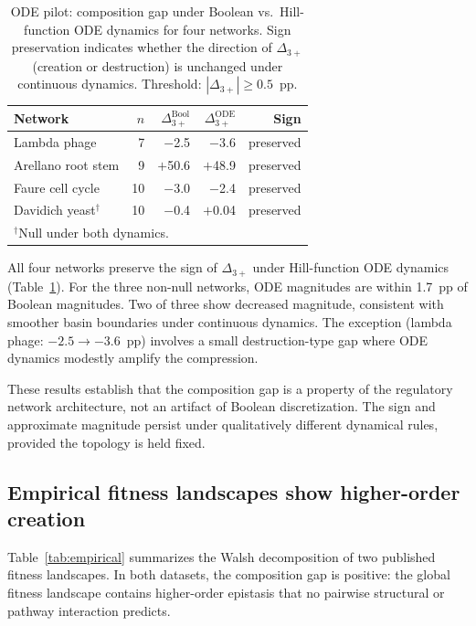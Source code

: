 \documentclass[10pt]{article}
\begin{document}
\begin{table}[t]
\centering
\caption{ODE pilot: composition gap under Boolean vs.\ Hill-function
ODE dynamics for four networks. Sign preservation indicates whether
the direction of $\Delta_{3+}$ (creation or destruction) is
unchanged under continuous dynamics. Threshold: $|\Delta_{3+}| \geq
0.5$~pp.}
\label{tab:ode-pilot}
\begin{tabular}{lrrrr}
\toprule
Network & $n$ & $\Delta_{3+}^{\mathrm{Bool}}$ & $\Delta_{3+}^{\mathrm{ODE}}$ & Sign \\
\midrule
Lambda phage & 7 & $-$2.5 & $-$3.6 & preserved \\
Arellano root stem & 9 & $+$50.6 & $+$48.9 & preserved \\
Faure cell cycle & 10 & $-$3.0 & $-$2.4 & preserved \\
Davidich yeast$^\dagger$ & 10 & $-$0.4 & $+$0.04 & preserved \\
\bottomrule
\multicolumn{5}{l}{\footnotesize $^\dagger$Null under both dynamics.} \\
\end{tabular}
\end{table}

All four networks preserve the sign of $\Delta_{3+}$ under
Hill-function ODE dynamics (Table~\ref{tab:ode-pilot}). For the
three non-null networks, ODE magnitudes are within 1.7~pp of
Boolean magnitudes. Two of three show decreased magnitude, consistent
with smoother basin boundaries under continuous dynamics. The
exception (lambda phage: $-2.5 \to -3.6$~pp) involves a small
destruction-type gap where ODE dynamics modestly amplify the
compression.

These results establish that the composition gap is a property of
the regulatory network architecture, not an artifact of Boolean
discretization. The sign and approximate magnitude persist under
qualitatively different dynamical rules, provided the topology is
held fixed.


\subsection{Empirical fitness landscapes show higher-order creation}
\label{sec:empirical-results}

Table~\ref{tab:empirical} summarizes the Walsh decomposition of two
published fitness landscapes. In both datasets, the composition gap
is positive: the global fitness landscape contains higher-order
epistasis that no pairwise structural or pathway interaction
predicts.
\end{document}
